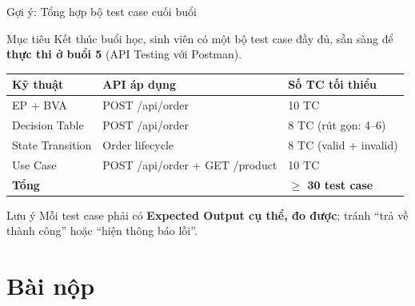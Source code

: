 \documentclass[aspectratio=169,12pt]{beamer}
\begin{document}
\begin{frame}[shrink=8]{Gợi ý: Tổng hợp bộ test case cuối buổi}
  \begin{block}{Mục tiêu}
    Kết thúc buổi học, sinh viên có một bộ test case đầy đủ,
    sẵn sàng để \textbf{thực thi ở buổi 5} (API Testing với Postman).
  \end{block}

  \vspace{0.1em}
  \begin{center}
  \scriptsize
  \setlength{\tabcolsep}{5pt}
  \begin{tabular}{lll}
    \toprule
    \textbf{Kỹ thuật} & \textbf{API áp dụng} & \textbf{Số TC tối thiểu} \\
    \midrule
    EP + BVA      & POST /api/order     & 10 TC \\
    Decision Table & POST /api/order    & 8 TC (rút gọn: 4--6) \\
    State Transition & Order lifecycle  & 8 TC (valid + invalid) \\
    Use Case      & POST /api/order + GET /product & 10 TC \\
    \midrule
    \textbf{Tổng} & & \textbf{$\geq$ 30 test case} \\
    \bottomrule
  \end{tabular}
  \end{center}

  \vspace{0.05em}
  \begin{exampleblock}{Lưu ý}
    \small Mỗi test case phải có \textbf{Expected Output cụ thể, đo được}; tránh ``trả về thành công'' hoặc ``hiện thông báo lỗi''.
  \end{exampleblock}
\end{frame}

\section{Bài nộp}
\end{document}

